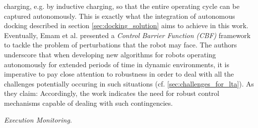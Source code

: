 \documentclass[english, master, utf8]{base/thesis_KBS}
\begin{document}
charging, e.g. by inductive charging, so that the entire operating cycle can be captured autonomously. This is exactly what the integration of autonomous docking described in section
\ref{sec:docking_solution} aims to achieve in this work.\newline
Eventually, Emam et al. \cite{Emam:2021} presented a \textit{Control Barrier Function (CBF)} framework to tackle the problem of perturbations that the robot may face. The authors
underscore that when developing new algorithms for robots operating autonomously for extended periods of time in dynamic environments, it is imperative to pay close attention to
robustness in order to deal with all the challenges potentially occuring in such situations (cf. \ref{sec:challenges_for_lta}). As they claim: 
\cite{Emam:2021} Accordingly, the work indicates the need for robust control mechanisms capable of dealing with such contingencies.\newline

\noindent
\textit{Execution Monitoring.}\newline
\end{document}
